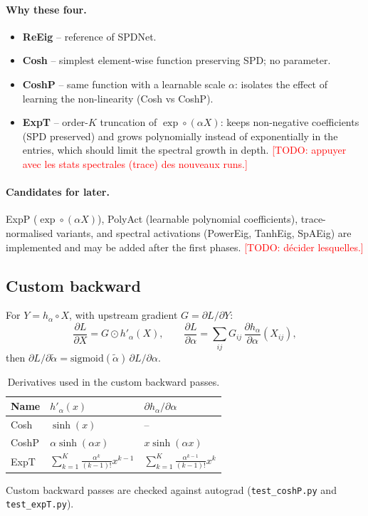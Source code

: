 \documentclass[11pt,a4paper]{article}
\newcommand{\todo}[1]{\textcolor{red}{[TODO: #1]}}
\newcommand{\circop}{\circ}
\begin{document}
\paragraph{Why these four.}
\begin{itemize}
  \item \textbf{ReEig} -- reference of SPDNet.
  \item \textbf{Cosh} -- simplest element-wise function preserving SPD; no parameter.
  \item \textbf{CoshP} -- same function with a learnable scale $\alpha$: isolates the effect
        of learning the non-linearity (Cosh vs CoshP).
  \item \textbf{ExpT} -- order-$K$ truncation of $\exp \circ (\alpha X)$: keeps non-negative
        coefficients (SPD preserved) and grows polynomially instead of exponentially in
        the entries, which should limit the spectral growth in depth.
        \todo{appuyer avec les stats spectrales (trace) des nouveaux runs.}
\end{itemize}

\paragraph{Candidates for later.}
ExpP ($\exp\circ(\alpha X)$), PolyAct (learnable polynomial coefficients), trace-normalised
variants, and spectral activations (PowerEig, TanhEig, SpAEig) are implemented and may be
added after the first phases. \todo{décider lesquelles.}

\subsection{Custom backward}
For $Y = h_\alpha \circop X$, with upstream gradient $G = \partial L/\partial Y$:
\begin{equation}
  \frac{\partial L}{\partial X} = G \odot h'_\alpha(X), \qquad
  \frac{\partial L}{\partial \alpha} = \sum_{ij} G_{ij}\, \frac{\partial h_\alpha}{\partial \alpha}(X_{ij}),
\end{equation}
then $\partial L/\partial\tilde\alpha = \mathrm{sigmoid}(\tilde\alpha)\,\partial L/\partial\alpha$.

\begin{table}[h]
\centering
\caption{Derivatives used in the custom backward passes.}
\label{tab:backward}
\begin{tabular}{lll}
\toprule
Name & $h'_\alpha(x)$ & $\partial h_\alpha / \partial \alpha$ \\
\midrule
Cosh  & $\sinh(x)$ & -- \\
CoshP & $\alpha \sinh(\alpha x)$ & $x \sinh(\alpha x)$ \\
ExpT  & $\sum_{k=1}^{K} \frac{\alpha^k}{(k-1)!} x^{k-1}$ & $\sum_{k=1}^{K} \frac{\alpha^{k-1}}{(k-1)!} x^{k}$ \\
\bottomrule
\end{tabular}
\end{table}
Custom backward passes are checked against autograd
(\texttt{test\_coshP.py} and \texttt{test\_expT.py}).
\end{document}
